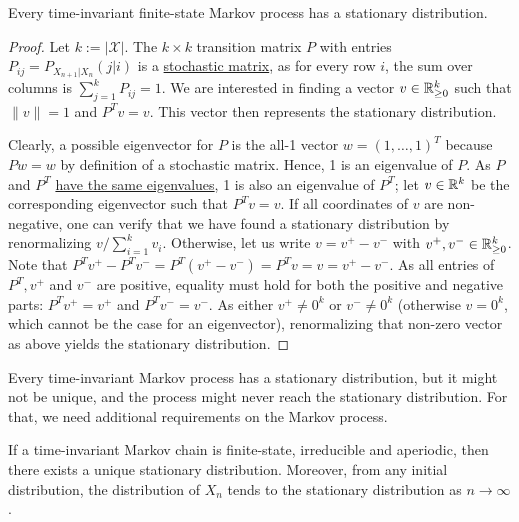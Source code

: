 \begin{proposition}
Every time-invariant finite-state Markov process has a stationary distribution.
\end{proposition}
\begin{proof}
Let $k:= |\mathcal{X}|$. The $k \times k$ transition matrix $P$ with entries $P_{ij} = P_{X_{n+1}|X_n}(j|i)$
is a \href{https://en.wikipedia.org/wiki/Stochastic_matrix}{stochastic matrix}, as for every row $i$, the sum over columns is
$\sum_{j=1}^k P_{ij} = 1$. We are interested in finding a vector $v \in \mathbb{R}_{\geq 0}^k$ such that $\|v\| = 1$ and $P^Tv = v$. This vector then represents the stationary distribution.

Clearly, a possible eigenvector for $P$ is the all-1
vector $w=(1,\ldots,1)^T$ because $P w = w$ by definition of a
stochastic matrix. Hence, 1 is an eigenvalue of $P$. As $P$ and $P^T$ \href{https://math.stackexchange.com/questions/123923/a-matrix-and-its-transpose-have-the-same-set-of-eigenvalues/123927}{have the same eigenvalues}, 1 is
also an eigenvalue of $P^T$; let $v \in \mathbb{R}^k$ be the corresponding eigenvector such that
$P^T v = v$. If all coordinates of $v$ are non-negative, one can
verify that we have found a
stationary distribution by renormalizing $v / \sum_{i=1}^k v_i$. Otherwise,
let us write $v = v^+ - v^-$ with $v^+,v^- \in \mathbb{R}_{\geq 0}^k$. Note
that $P^T v^+ - P^T v^- = P^T (v^+ - v^-) = P^T v = v = v^+ - v^-$. As all entries
of $P^T, v^+$ and $v^-$ are positive, equality must hold for both the
positive and negative parts: $P^T v^+ = v^+$ and $P^T v^- = v^-$. As either $v^+ \neq 0^k$ or $v^-
\neq 0^k$ (otherwise $v = 0^k$, which cannot be the case for an
eigenvector), renormalizing that non-zero vector as above yields the stationary distribution.
\end{proof}

Every time-invariant Markov process has a stationary distribution, but it might not be unique, and the process might never reach the stationary distribution. For that, we need additional requirements on the Markov process.

\begin{proposition}
If a time-invariant Markov chain is finite-state, irreducible and aperiodic, then there exists a unique stationary distribution. Moreover, from any initial distribution, the distribution of $X_n$ tends to the stationary distribution as $n \to \infty$.
\end{proposition}


